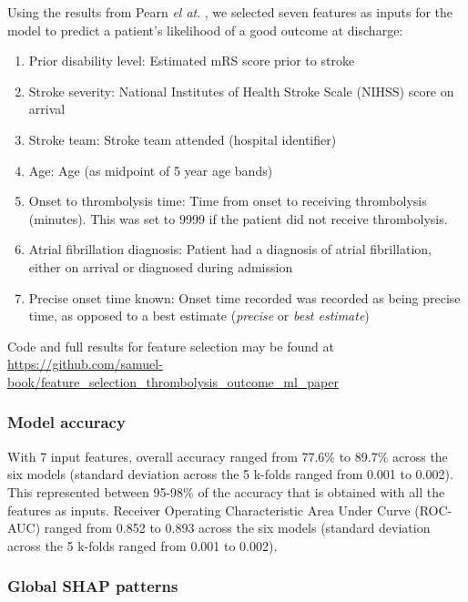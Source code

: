 Using the results from Pearn \textit{el at}. \cite{pearn_are_2024}, we selected seven features as inputs for the model to predict a patient's likelihood of a good outcome at discharge:

\begin{enumerate}
    \item Prior disability level: Estimated mRS score prior to stroke
    \item Stroke severity: National Institutes of Health Stroke Scale (NIHSS) score on arrival
    \item Stroke team: Stroke team attended (hospital identifier)
    \item Age: Age (as midpoint of 5 year age bands)
    \item Onset to thrombolysis time: Time from onset to receiving thrombolysis (minutes). This was set to 9999 if the patient did not receive thrombolysis.
    \item Atrial fibrillation diagnosis: Patient had a diagnosis of atrial fibrillation, either on arrival or diagnosed during admission
    \item Precise onset time known: Onset time recorded was recorded as being precise time, as opposed to a best estimate (\textit{precise} or  \textit{best estimate})
\end{enumerate}

Code and full results for feature selection may be found at \url{https://github.com/samuel-book/feature_selection_thrombolysis_outcome_ml_paper}

\subsubsection{Model accuracy}

With 7 input features, overall accuracy ranged from 77.6\% to 89.7\% across the six models (standard deviation across the 5 k-folds ranged from 0.001 to 0.002). This represented between 95-98\% of the accuracy that is obtained with all the features as inputs. Receiver Operating Characteristic Area Under Curve (ROC-AUC) ranged from 0.852 to 0.893 across the six models (standard deviation across the 5 k-folds ranged from 0.001 to 0.002).

\subsubsection{Global SHAP patterns}

